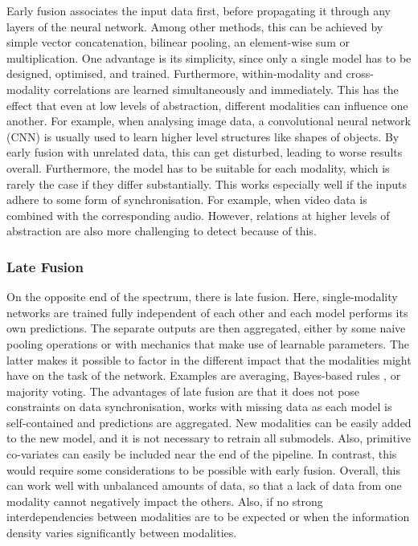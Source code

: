 Early fusion associates the input data first, before propagating it through any layers of the neural network. Among other methods, this can be achieved by simple vector concatenation, bilinear pooling, 
\cite{Tenenbaum2000Separating}
an element-wise sum or multiplication. One advantage is its simplicity, since only a single model has to be designed, optimised, and trained. Furthermore, within-modality and cross-modality correlations are learned simultaneously and immediately. This has the effect that even at low levels of abstraction, different modalities can influence one another. For example, when analysing image data, a convolutional neural network (CNN) is usually used to learn higher level structures like shapes of objects. \cite{Stahlschmidt2022Multimodal}
By early fusion with unrelated data, this can get disturbed, leading to worse results overall. Furthermore, the model has to be suitable for each modality, which is rarely the case if they differ substantially. This works especially well if the inputs adhere to some form of synchronisation. For example, when video data is combined with the corresponding audio. \cite{Lipkova2022Artificial}
However, relations at higher levels of abstraction are also more challenging to detect because of this. \cite{Stahlschmidt2022Multimodal}

\subsubsection{Late Fusion}

On the opposite end of the spectrum, there is late fusion. Here, single-modality networks are trained fully independent of each other and each model performs its own predictions. The separate outputs are then aggregated, either by some naive pooling operations or with mechanics that make use of learnable parameters. The latter makes it possible to factor in the different impact that the modalities might have on the task of the network. Examples are averaging\cite{Huang2020Multimodal}, Bayes-based rules \cite{Reda2018Deep}, or majority voting. \cite{Morvant2014Majority}
The advantages of late fusion are that it does not pose constraints on data synchronisation, works with missing data as each model is self-contained and predictions are aggregated. New modalities can be easily added to the new model, and it is not necessary to retrain all submodels. Also, primitive co-variates can easily be included near the end of the pipeline. In contrast, this would require some considerations to be possible with early fusion. 
Overall, this can work well with unbalanced amounts of data, so that a lack of data from one modality cannot negatively impact the others. Also, if no strong interdependencies between modalities are to be expected or when the information density varies significantly between modalities. \cite{Lipkova2022Artificial, Stahlschmidt2022Multimodal}

